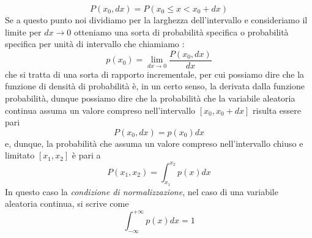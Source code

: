 \documentclass{report}
\begin{document}
$$
	P(x_0, dx) = P(x_0 \leq x < x_0 + dx)
$$
Se a questo punto noi dividiamo per la larghezza dell'intervallo e consideriamo il limite per $dx \to 0$ otteniamo una sorta di probabilità specifica o probabilità specifica per unità di intervallo che chiamiamo \emph{}:
\begin{equation}
	p(x_0) = \lim_{dx \to 0} \frac{P(x_0, dx)}{dx}
\end{equation}
che si tratta di una sorta di rapporto incrementale, per cui possiamo dire che la funzione di densità di probabilità è, in un certo senso, la derivata dalla funzione probabilità, dunque possiamo dire che la probabilità che la variabile aleatoria continua assuma un valore compreso nell'intervallo $[x_0, x_0 + dx]$ risulta essere pari
$$
	P(x_0, dx) = p(x_0)dx
$$
e, dunque, la probabilità che assuma un valore compreso nell'intervallo chiuso e limitato $[x_1, x_2]$ è pari a
\begin{equation}
	P(x_1, x_2) = \int_{x_1}^{x_2} p(x)dx
\end{equation}
In questo caso la \emph{condizione di normalizzazione}, nel caso di una variabile aleatoria continua, si scrive come
\begin{equation}
	\int_{-\infty}^{+\infty} p(x)dx = 1
\end{equation}
\end{document}
